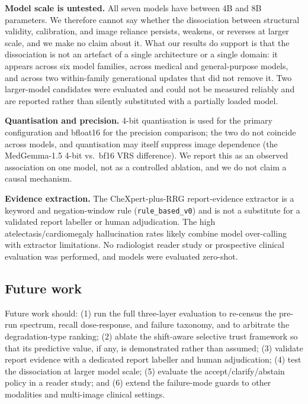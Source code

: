 \textbf{Model scale is untested.} All seven models have between 4B and 8B
parameters. We therefore cannot say whether the dissociation between structural
validity, calibration, and image reliance persists, weakens, or reverses at larger
scale, and we make no claim about it. What our results do support is that the
dissociation is not an artefact of a single architecture or a single domain: it
appears across six model families, across medical and general-purpose models, and
across two within-family generational updates that did not remove it. Two
larger-model candidates were evaluated and could not be measured reliably and are
reported rather than silently substituted with a partially loaded model.

\textbf{Quantisation and precision.} 4-bit quantisation is used for the primary
configuration and bfloat16 for the precision comparison; the two do not coincide
across models, and quantisation may itself suppress image dependence (the
MedGemma-1.5 4-bit vs.\ bf16 VRS difference). We report this as an observed
association on one model, not as a controlled ablation, and we do not claim a
causal mechanism.

\textbf{Evidence extraction.} The CheXpert-plus-RRG report-evidence extractor is a
keyword and negation-window rule (\texttt{rule\_based\_v0}) and is not a
substitute for a validated report labeller or human adjudication. The high
atelectasis/cardiomegaly hallucination rates likely combine model over-calling
with extractor limitations. No radiologist reader study or prospective clinical
evaluation was performed, and models were evaluated zero-shot.

\subsection{Future work}

Future work should: (1) run the full three-layer evaluation to re-census the
pre-run spectrum, recall dose-response, and failure taxonomy, and to arbitrate the
degradation-type ranking; (2) ablate the shift-aware selective trust framework so
that its predictive value, if any, is demonstrated rather than assumed; (3)
validate report evidence with a dedicated report labeller and human adjudication;
(4) test the dissociation at larger model scale; (5) evaluate the
accept/clarify/abstain policy in a reader study; and (6) extend the failure-mode
guards to other modalities and multi-image clinical settings.